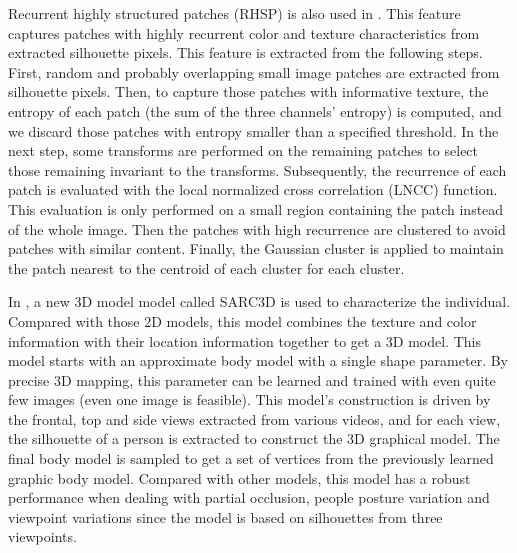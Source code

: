 Recurrent highly structured patches (RHSP) is also used in \cite{SDALF}. This feature captures patches with highly recurrent color and texture characteristics from extracted silhouette pixels. This feature is extracted from the following steps. First, random and probably overlapping small image patches are extracted from silhouette pixels. Then, to capture those patches with informative texture, the entropy of each patch (the sum of the three channels' entropy) is computed, and we discard those patches with entropy smaller than a specified threshold. In the next step, some transforms are performed on the remaining patches to select those remaining invariant to the transforms. Subsequently, the recurrence of each patch is evaluated with the local normalized cross correlation (LNCC) function. This evaluation is only performed on a small region containing the patch instead of the whole image. Then the patches with high recurrence are clustered to avoid patches with similar content. Finally, the Gaussian cluster is applied to maintain the patch nearest to the centroid of each cluster for each cluster.

In \cite{SARC3D}, a new 3D model model called SARC3D  is used to characterize the individual. Compared with those 2D models, this model combines the texture and color information with their location information together to get a 3D model. This model starts with an approximate body model with a single shape parameter. By precise 3D mapping, this parameter can be learned and trained with even quite few images (even one image is feasible). This model's construction is driven by the frontal, top and side views extracted from various videos, and for each view, the silhouette of a person is extracted to construct the 3D graphical model. The final body model is sampled to get a set of vertices from the previously learned graphic body model. Compared with other models, this model has a robust performance when dealing with partial occlusion, people posture variation and viewpoint variations since the model is based on silhouettes from three viewpoints.

